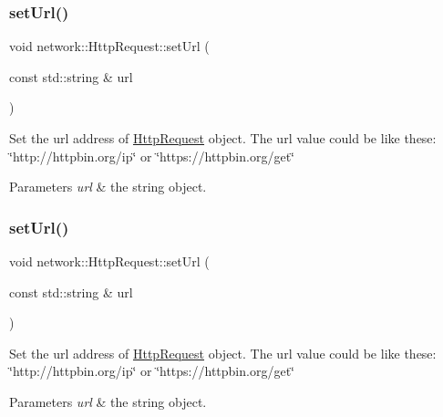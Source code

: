 \subsubsection{\texorpdfstring{set\+Url()}{setUrl()}\hspace{0.1cm}{\footnotesize\ttfamily [1/2]}}
{\footnotesize\ttfamily void network\+::\+Http\+Request\+::set\+Url (\begin{DoxyParamCaption}\item[{const std\+::string \&}]{url }\end{DoxyParamCaption})\hspace{0.3cm}{\ttfamily [inline]}}

Set the url address of \hyperlink{classnetwork_1_1HttpRequest}{Http\+Request} object. The url value could be like these\+: \char`\"{}http\+://httpbin.\+org/ip\char`\"{} or \char`\"{}https\+://httpbin.\+org/get\char`\"{}


\begin{DoxyParams}{Parameters}
{\em url} & the string object. \\
\hline
\end{DoxyParams}
\mbox{\label{classnetwork_1_1HttpRequest_a2f7663791f980b15c90c34acf281fe4a}} 
\subsubsection{\texorpdfstring{set\+Url()}{setUrl()}\hspace{0.1cm}{\footnotesize\ttfamily [2/2]}}
{\footnotesize\ttfamily void network\+::\+Http\+Request\+::set\+Url (\begin{DoxyParamCaption}\item[{const std\+::string \&}]{url }\end{DoxyParamCaption})\hspace{0.3cm}{\ttfamily [inline]}}

Set the url address of \hyperlink{classnetwork_1_1HttpRequest}{Http\+Request} object. The url value could be like these\+: \char`\"{}http\+://httpbin.\+org/ip\char`\"{} or \char`\"{}https\+://httpbin.\+org/get\char`\"{}


\begin{DoxyParams}{Parameters}
{\em url} & the string object. \\
\hline
\end{DoxyParams}
\mbox{\label{classnetwork_1_1HttpRequest_a7afec412b6f1fb5ab420212f7889313d}} 
